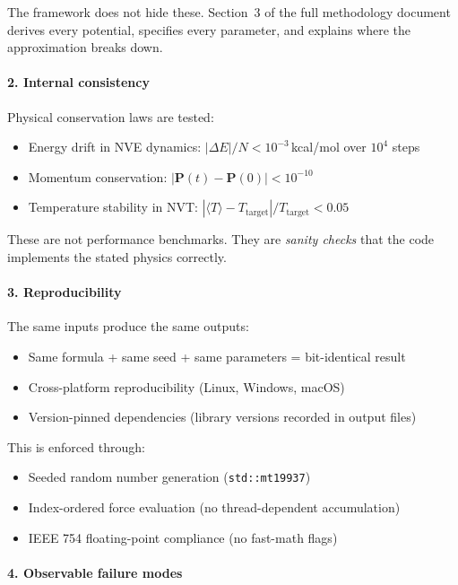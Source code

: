 \documentclass[11pt]{article}
\begin{document}
The framework does not hide these. Section~3 of the full methodology document derives every potential, specifies every parameter, and explains where the approximation breaks down.

\paragraph{2. Internal consistency}

Physical conservation laws are tested:
\begin{itemize}
\item Energy drift in NVE dynamics: $|\Delta E|/N < 10^{-3}$\,kcal/mol over $10^4$ steps
\item Momentum conservation: $|\mathbf{P}(t) - \mathbf{P}(0)| < 10^{-10}$
\item Temperature stability in NVT: $|\langle T \rangle - T_{\text{target}}|/T_{\text{target}} < 0.05$
\end{itemize}

These are not performance benchmarks. They are \textit{sanity checks} that the code implements the stated physics correctly.

\paragraph{3. Reproducibility}

The same inputs produce the same outputs:
\begin{itemize}
\item Same formula + same seed + same parameters = bit-identical result
\item Cross-platform reproducibility (Linux, Windows, macOS)
\item Version-pinned dependencies (library versions recorded in output files)
\end{itemize}

This is enforced through:
\begin{itemize}
\item Seeded random number generation (\texttt{std::mt19937})
\item Index-ordered force evaluation (no thread-dependent accumulation)
\item IEEE 754 floating-point compliance (no fast-math flags)
\end{itemize}

\paragraph{4. Observable failure modes}
\end{document}
